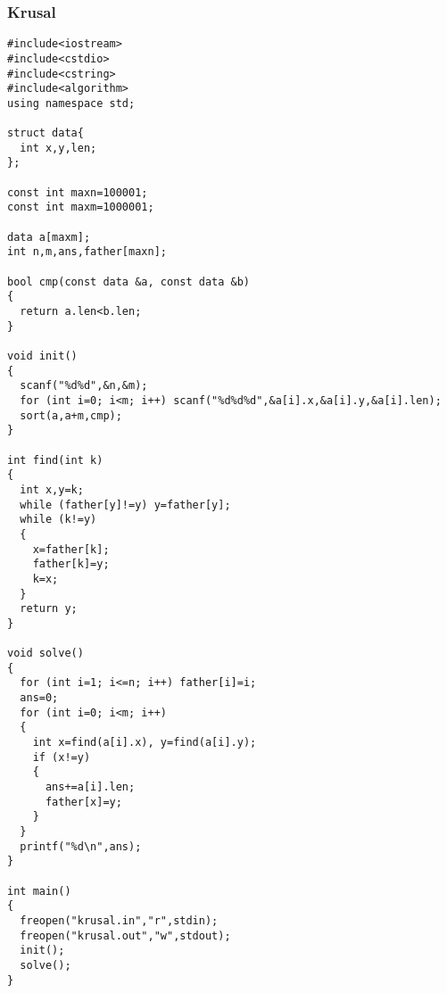 \subsubsection{Krusal}

\begin{verbatim}
#include<iostream>
#include<cstdio>
#include<cstring>
#include<algorithm>
using namespace std;

struct data{
  int x,y,len;
};

const int maxn=100001;
const int maxm=1000001;

data a[maxm];
int n,m,ans,father[maxn];

bool cmp(const data &a, const data &b)
{
  return a.len<b.len;
}

void init()
{
  scanf("%d%d",&n,&m);
  for (int i=0; i<m; i++) scanf("%d%d%d",&a[i].x,&a[i].y,&a[i].len);
  sort(a,a+m,cmp);
}

int find(int k)
{
  int x,y=k;
  while (father[y]!=y) y=father[y];
  while (k!=y)
  {
    x=father[k];
    father[k]=y;
    k=x;
  }
  return y;
}

void solve()
{
  for (int i=1; i<=n; i++) father[i]=i;
  ans=0;
  for (int i=0; i<m; i++)
  {
    int x=find(a[i].x), y=find(a[i].y);
    if (x!=y)
    {
      ans+=a[i].len;
      father[x]=y;
    }
  }
  printf("%d\n",ans);
}

int main()
{
  freopen("krusal.in","r",stdin);
  freopen("krusal.out","w",stdout);
  init();
  solve();
}
\end{verbatim}
